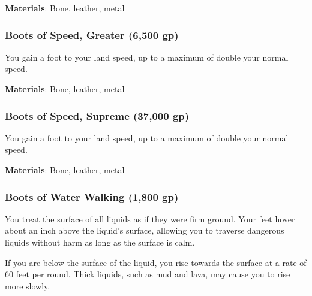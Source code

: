 \vspace{0.25em}
\textbf{Materials}: Bone, leather, metal


\lowercase{\hypertarget{item:Boots of Speed, Greater}{}}\label{item:Boots of Speed, Greater}
\hypertarget{item:Boots of Speed, Greater}{\subsubsection{Boots of Speed, Greater\hfill{} (6,500 gp)}}

You gain a  foot  to your land speed, up to a maximum of double your normal speed.



\vspace{0.25em}
\textbf{Materials}: Bone, leather, metal


\lowercase{\hypertarget{item:Boots of Speed, Supreme}{}}\label{item:Boots of Speed, Supreme}
\hypertarget{item:Boots of Speed, Supreme}{\subsubsection{Boots of Speed, Supreme\hfill{} (37,000 gp)}}

You gain a  foot  to your land speed, up to a maximum of double your normal speed.



\vspace{0.25em}
\textbf{Materials}: Bone, leather, metal


\lowercase{\hypertarget{item:Boots of Water Walking}{}}\label{item:Boots of Water Walking}
\hypertarget{item:Boots of Water Walking}{\subsubsection{Boots of Water Walking\hfill{} (1,800 gp)}}

You treat the surface of all liquids as if they were firm ground.
Your feet hover about an inch above the liquid's surface, allowing you to traverse dangerous liquids without harm as long as the surface is calm.

If you are below the surface of the liquid, you rise towards the surface at a rate of 60 feet per round.
Thick liquids, such as mud and lava, may cause you to rise more slowly.




